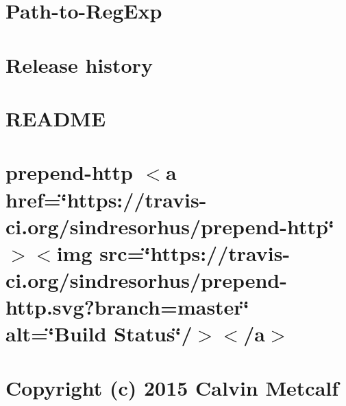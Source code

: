 \let\mypdfximage\pdfximage\def\pdfximage{\immediate\mypdfximage}\documentclass[twoside]{book}
\newcommand{\+}{\discretionary{\mbox{\scriptsize$\hookleftarrow$}}{}{}}
\begin{document}
\chapter{Path-\/to-\/\+Reg\+Exp}
\label{md__c_1__git_hub__p_r_o_y_e_c_t_o-_i_i_i-_g_o_t_rest-api-node-mysql_node_modules_path-to-regexp__readme}

\chapter{Release history}
\label{md__c_1__git_hub__p_r_o_y_e_c_t_o-_i_i_i-_g_o_t_rest-api-node-mysql_node_modules_picomatch__c_h_a_n_g_e_l_o_g}

\chapter{R\+E\+A\+D\+ME}
\label{md__c_1__git_hub__p_r_o_y_e_c_t_o-_i_i_i-_g_o_t_rest-api-node-mysql_node_modules_picomatch__r_e_a_d_m_e}

\chapter{prepend-\/http $<$a href=\char`\"{}https\+://travis-\/ci.\+org/sindresorhus/prepend-\/http\char`\"{}$>$$<$img src=\char`\"{}https\+://travis-\/ci.\+org/sindresorhus/prepend-\/http.\+svg?branch=master\char`\"{} alt=\char`\"{}\+Build Status\char`\"{}/$>$$<$/a$>$}
\label{md__c_1__git_hub__p_r_o_y_e_c_t_o-_i_i_i-_g_o_t_rest-api-node-mysql_node_modules_prepend-http_readme}

\chapter{Copyright (c) 2015 Calvin Metcalf}
\label{md__c_1__git_hub__p_r_o_y_e_c_t_o-_i_i_i-_g_o_t_rest-api-node-mysql_node_modules_process-nextick-args_license}

\end{document}
